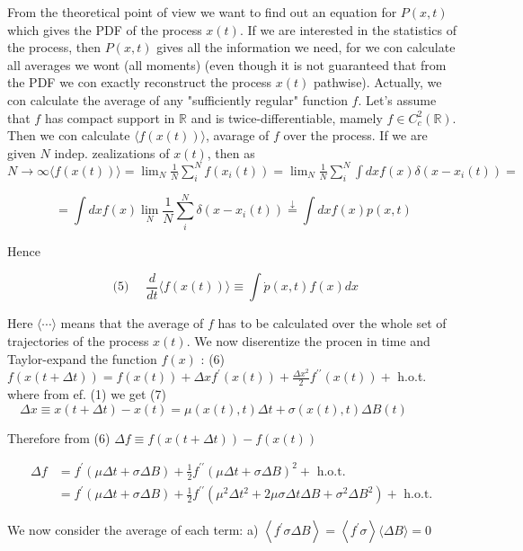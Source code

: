 From the theoretical point of view we want to find out an equation for $P(x, t)$ which gives the PDF of the process $x(t)$. If we are interested in the statistics of the process, then $P(x, t)$ gives all the information we need, for we con
calculate all averages we wont (all moments)
(even though it is not guaranteed that from the PDF we con exactly reconstruct the process $x(t)$ pathwise).
Actually, we con calculate the average of any "sufficiently regular" function $f$.
Let's assume that $f$ has compact support in $\mathbb{R}$ and is twice-differentiable, mamely $f \in C_{c}^{2}(\mathbb{R})$.
Then we con calculate $\langle f(x(t))\rangle$, avarage of $f$ over the process. If we are given $N$ indep. zealizations of $x(t)$, then as $N \rightarrow \infty \langle f(x(t))\rangle=\lim _{N} \frac{1}{N} \sum_{i}^{N} f\left(x_{i}(t)\right)=\lim _{N} \frac{1}{N} \sum_{i}^{N} \int d x f(x) \delta\left(x-x_{i}(t)\right)=$


\begin{equation*}
=\int d x f(x) \lim _{N} \frac{1}{N} \sum_{i}^{N} \delta\left(x-x_{i}(t)\right) \stackrel{\downarrow}{=} \int d x f(x) p(x, t) \tag{35}
\end{equation*}


Hence

$$ \text { (5) } \quad \frac{d}{d t}\langle f(x(t))\rangle \equiv \int \dot{p}(x, t) f(x) d x $$

Here $\langle\cdots\rangle$ means that the average of $f$ has to be calculated over the whole set of trajectories of the process $x(t)$. We now diserentize the procen in time and Taylor-expand the function $f(x)$ :
(6) $f(x(t+\Delta t))=f(x(t))+\Delta x f^{\prime}(x(t))+\frac{\Delta x^{2}}{2} f^{\prime \prime}(x(t))+$ h.o.t.
where from ef. (1) we get
(7) $\quad \Delta x \equiv x(t+\Delta t)-x(t)=\mu(x(t), t) \Delta t+\sigma(x(t), t) \Delta B(t)$

Therefore from (6) $\Delta f \equiv f(x(t+\Delta t))-f(x(t))$

$$ \begin{aligned}
\Delta f & =f^{\prime}(\mu \Delta t+\sigma \Delta B)+\frac{1}{2} f^{\prime \prime}(\mu \Delta t+\sigma \Delta B)^{2}+\text { h.o.t. } \\
& =f^{\prime}(\mu \Delta t+\sigma \Delta B)+\frac{1}{2} f^{\prime \prime}\left(\mu^2\Delta t^2+2 \mu \sigma \Delta t \Delta B+\sigma^{2} \Delta B^{2}\right)+\text { h.o.t. }
\end{aligned} $$

We now consider the average of each term:
a) $\left\langle f^{\prime} \sigma \Delta B\right\rangle=\left\langle f^{\prime} \sigma\right\rangle\langle\Delta B\rangle=0$

